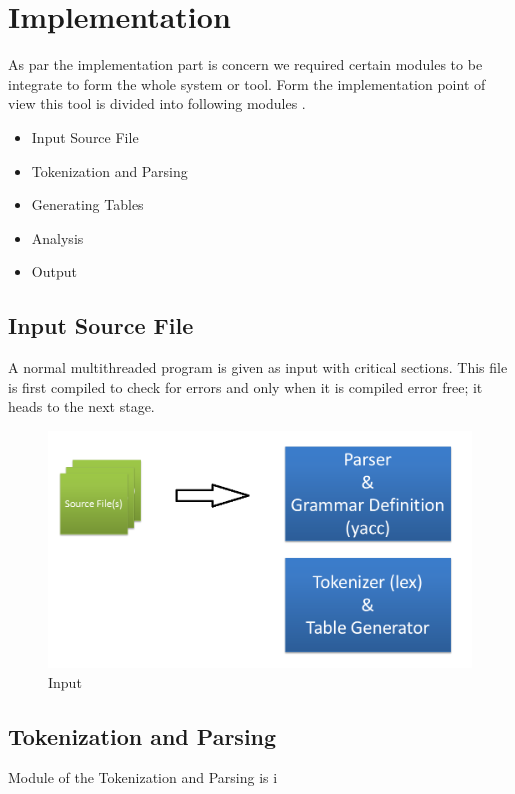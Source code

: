 \chapter{Implementation}
As par the implementation part is concern we required certain modules to be integrate to form the whole system or tool. Form the implementation point of view this tool is divided into following modules .
\begin{itemize}
\item Input Source File
\item Tokenization and Parsing
\item Generating Tables
\item Analysis
\item Output
\end{itemize}

\section{Input Source File}

A normal multithreaded program is given as input with critical sections. This file is first compiled to check for errors and only when it is compiled error free; it heads to the next stage.
\begin{figure}[H]
\centering
\includegraphics[scale=0.4]{input.png}
\caption{Input}
\label{<<Label>>}
\end{figure}

\section{Tokenization and Parsing}

Module of the Tokenization and Parsing is i

